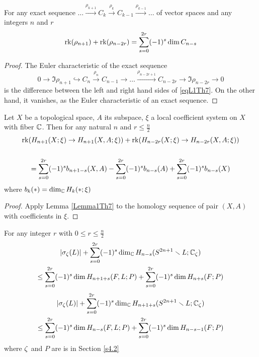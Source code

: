 \documentclass{article}
\numberwithin{equation}{section}
\begin{document}
\begin{lem}\label{Lemma1Th7}
For any exact sequence $\dots\overset{\rho_{k+1}}\to C_k\overset{\rho_k}\to
 C_{k-1}\overset{\rho_{k-1}}\to\dots$ of vector spaces
and any integers $n$ and $r$ 
\begin{equation}\label{eqL1Th7} \operatorname{rk}(\rho_{n+1})+\operatorname{rk}(\rho_{n-2r})
=\sum_{s=0}^{2r}(-1)^s\dim C_{n-s}
\end{equation}
\end{lem}

\begin{proof}The Euler characteristic of the exact sequence
$$
0\to\Im\rho_{n+1}\hookrightarrow C_n\overset{\rho_{n}}\to
C_{n-1}\to\dots\overset{\rho_{n-2r+1}}\to C_{n-2r}\to\Im\rho_{n-2r}\to0
$$ 
is the difference between the left and right hand sides of \eqref{eqL1Th7}.
On the other hand, it vanishes, as the Euler characteristic of an exact
sequence. 
\end{proof}

\begin{lem}\label{Lemma2Th7}
Let $X$ be a topological space, $A$ its subspace, $\xi$ a local coefficient
system on $X$ with fiber $\mathbb C$. Then for any natural $n$ and $r\le\frac{n}2$
\begin{multline}
\operatorname{rk}(H_{n+1}(X;\xi)\to H_{n+1}(X,A;\xi))+
 \operatorname{rk}(H_{n-2r}(X;\xi)\to H_{n-2r}(X,A;\xi))\\
\\
=\sum_{s=0}^{2r}(-1)^sb_{n+1-s}(X,A)
-\sum_{s=0}^{2r}(-1)^sb_{n-s}(A)
+\sum_{s=0}^{2r}(-1)^sb_{n-s}(X)
\end{multline} 
where $b_k(*)=\dim_\mathbb C H_k(*;\xi)$
\end{lem}

\begin{proof}
Apply Lemma \ref{Lemma1Th7} to the homology sequence of pair $(X,A)$ with
coefficients in $\xi$.
\end{proof}

\begin{Th}\label{Th7} For any integer $r$ with $0\le r\le\frac{n}2$\\   
\begin{multline}\label{IneQSpan}
|\sigma_{\zeta}(L)|+\sum_{s=0}^{2r}(-1)^s\dim_\mathbb C
  H_{n-s}(S^{2n+1}\smallsetminus L;\mathbb C_\zeta)
\\  \le \sum_{s=0}^{2r}(-1)^s\dim H_{n+1+s}(F,L;P)
  +\sum_{s=0}^{2r}(-1)^s\dim H_{n+s}(F;P)
\end{multline}
\begin{multline}\label{IneQSpan2}
|\sigma_{\zeta}(L)|+\sum_{s=0}^{2r}(-1)^s\dim_\mathbb C
  H_{n+1+s}(S^{2n+1}\smallsetminus L;\mathbb C_\zeta)
\\  \le \sum_{s=0}^{2r}(-1)^s\dim H_{n-s}(F,L;P)
  +\sum_{s=0}^{2r}(-1)^s\dim H_{n-s-1}(F;P)
\end{multline}
where $\zeta$ and $P$ are is in Section \ref{s4.2}
\end{Th}
\end{document}
